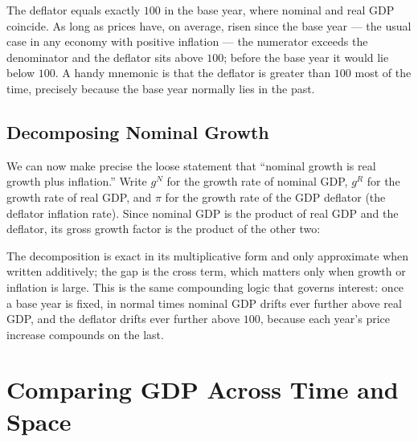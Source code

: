 The deflator equals exactly $100$ in the base year, where nominal and real GDP coincide. As long as prices have, on average, risen since the base year --- the usual case in any economy with positive inflation --- the numerator exceeds the denominator and the deflator sits above $100$; before the base year it would lie below $100$. A handy mnemonic is that the deflator is greater than $100$ most of the time, precisely because the base year normally lies in the past.

\subsection{Decomposing Nominal Growth}

We can now make precise the loose statement that ``nominal growth is real growth plus inflation.'' Write $g^{N}$ for the growth rate of nominal GDP, $g^{R}$ for the growth rate of real GDP, and $\pi$ for the growth rate of the GDP deflator (the deflator inflation rate). Since nominal GDP is the product of real GDP and the deflator, its gross growth factor is the product of the other two:



The decomposition is exact in its multiplicative form and only approximate when written additively; the gap is the cross term, which matters only when growth or inflation is large. This is the same compounding logic that governs interest: once a base year is fixed, in normal times nominal GDP drifts ever further above real GDP, and the deflator drifts ever further above $100$, because each year's price increase compounds on the last.

\section{Comparing GDP Across Time and Space}

